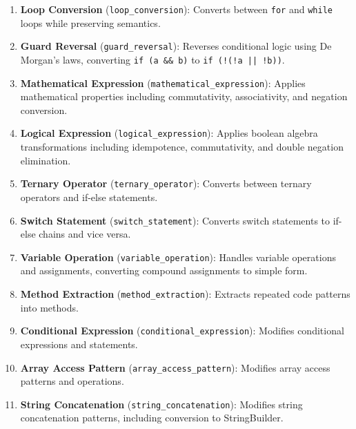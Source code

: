 \documentclass[acmsmall,screen,review,anonymous]{acmart}
\begin{document}
\begin{enumerate}
    \item \textbf{Loop Conversion} (\texttt{loop\_conversion}): Converts between \texttt{for} and \texttt{while} loops while preserving semantics.
    
    \item \textbf{Guard Reversal} (\texttt{guard\_reversal}): Reverses conditional logic using De Morgan's laws, converting \texttt{if (a \&\& b)} to \texttt{if (!(!a || !b))}.
    
    \item \textbf{Mathematical Expression} (\texttt{mathematical\_expression}): Applies mathematical properties including commutativity, associativity, and negation conversion.
    
    \item \textbf{Logical Expression} (\texttt{logical\_expression}): Applies boolean algebra transformations including idempotence, commutativity, and double negation elimination.
    
    \item \textbf{Ternary Operator} (\texttt{ternary\_operator}): Converts between ternary operators and if-else statements.
    
    \item \textbf{Switch Statement} (\texttt{switch\_statement}): Converts switch statements to if-else chains and vice versa.
    
    \item \textbf{Variable Operation} (\texttt{variable\_operation}): Handles variable operations and assignments, converting compound assignments to simple form.
    
    \item \textbf{Method Extraction} (\texttt{method\_extraction}): Extracts repeated code patterns into methods.
    
    \item \textbf{Conditional Expression} (\texttt{conditional\_expression}): Modifies conditional expressions and statements.
    
    \item \textbf{Array Access Pattern} (\texttt{array\_access\_pattern}): Modifies array access patterns and operations.
    
    \item \textbf{String Concatenation} (\texttt{string\_concatenation}): Modifies string concatenation patterns, including conversion to StringBuilder.
    

\end{enumerate}
\end{document}
